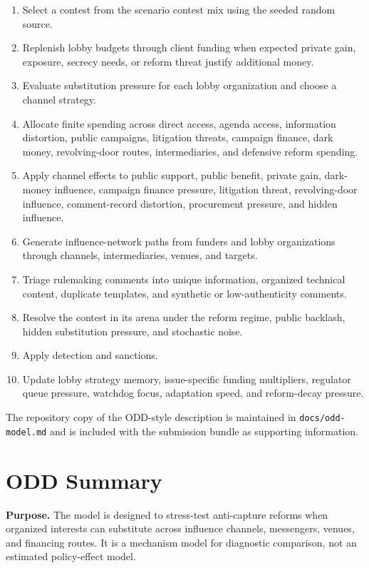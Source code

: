 \begin{enumerate}
  \item Select a contest from the scenario contest mix using the seeded random source.
  \item Replenish lobby budgets through client funding when expected private gain, exposure, secrecy needs, or reform threat justify additional money.
  \item Evaluate substitution pressure for each lobby organization and choose a channel strategy.
  \item Allocate finite spending across direct access, agenda access, information distortion, public campaigns, litigation threats, campaign finance, dark money, revolving-door routes, intermediaries, and defensive reform spending.
  \item Apply channel effects to public support, public benefit, private gain, dark-money influence, campaign finance pressure, litigation threat, revolving-door influence, comment-record distortion, procurement pressure, and hidden influence.
  \item Generate influence-network paths from funders and lobby organizations through channels, intermediaries, venues, and targets.
  \item Triage rulemaking comments into unique information, organized technical content, duplicate templates, and synthetic or low-authenticity comments.
  \item Resolve the contest in its arena under the reform regime, public backlash, hidden substitution pressure, and stochastic noise.
  \item Apply detection and sanctions.
  \item Update lobby strategy memory, issue-specific funding multipliers, regulator queue pressure, watchdog focus, adaptation speed, and reform-decay pressure.
\end{enumerate}

The repository copy of the ODD-style description is maintained in \texttt{docs/odd-model.md} and is included with the submission bundle as supporting information.

\section{ODD Summary}

\textbf{Purpose.} The model is designed to stress-test anti-capture reforms when organized interests can substitute across influence channels, messengers, venues, and financing routes. It is a mechanism model for diagnostic comparison, not an estimated policy-effect model.

